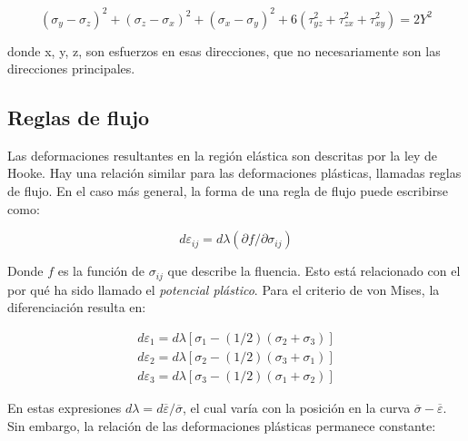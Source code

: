 \begin{equation}
(\sigma_y - \sigma_z)^2 + (\sigma_z - \sigma_x)^2 + (\sigma_x - \sigma_y)^2 + 6 (\tau_{yz}^2 + \tau_{zx}^2 + \tau_{xy}^2) = 2Y^2
\end{equation}

donde x, y, z, son esfuerzos en esas direcciones, que no necesariamente son las direcciones principales.


\subsection{Reglas de flujo}

Las deformaciones resultantes en la región elástica son descritas por la ley de Hooke. 
Hay una relación similar para las deformaciones plásticas, llamadas reglas de flujo. 
En el caso más general, la forma de una regla de flujo puede escribirse como: ~\cite{hosford2007}

\begin{equation}
d\varepsilon_{ij} = d\lambda (\partial f / \partial \sigma_{ij})
\end{equation}

Donde $f$ es la función de $\sigma_{ij}$ que describe la fluencia. Esto está relacionado 
con el por qué ha sido llamado el \textit{potencial plástico}. Para el criterio de 
von Mises, la diferenciación resulta en: ~\cite{hosford2007}

\begin{align}
d\varepsilon_1 = d\lambda \left[ \sigma_1 - (1/2) (\sigma_2 + \sigma_3) \right] \\
d\varepsilon_2 = d\lambda \left[ \sigma_2 - (1/2) (\sigma_3 + \sigma_1) \right] \\
d\varepsilon_3 = d\lambda \left[ \sigma_3 - (1/2) (\sigma_1 + \sigma_2) \right]
\end{align}

En estas expresiones $d\lambda = d \overline{\varepsilon} / \overline{\sigma} $, el cual varía 
con la posición en la curva $ \overline{\sigma} - \overline{\varepsilon} $. Sin embargo, la 
relación de las deformaciones plásticas permanece constante: ~\cite{hosford2007} \\



